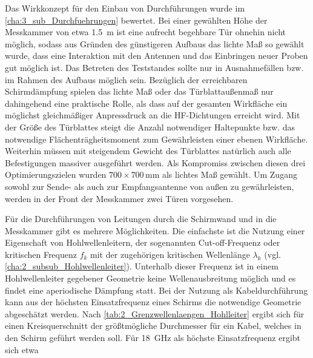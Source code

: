 \par
\vspace{\linespace} 
Das Wirkkonzept für den Einbau von Durchführungen wurde im \Abschnitt\ref{cha:3_sub_Durchfuehrungen} bewertet. Bei einer gewählten Höhe der Messkammer von etwa \SI{1,5}{\meter} ist eine aufrecht begehbare Tür ohnehin nicht möglich, sodass aus Gründen des günstigeren Aufbaus das lichte Maß so gewählt wurde, dass eine Interaktion mit den Antennen und das Einbringen neuer Proben gut möglich ist. Das Betreten des Teststandes sollte nur in Ausnahmefällen bzw. im Rahmen des Aufbaus möglich sein. Bezüglich der erreichbaren Schirmdämpfung spielen das lichte Maß oder das Türblattaußenmaß nur dahingehend eine praktische Rolle, als dass auf der gesamten Wirkfläche ein möglichst gleichmäßiger Anpressdruck an die HF-Dichtungen erreicht wird. Mit der Größe des Türblattes steigt die Anzahl notwendiger Haltepunkte bzw. das notwendige Flächenträgheitsmoment zum Gewährleisten einer ebenen Wirkfläche. Weiterhin müssen mit steigendem Gewicht des Türblattes natürlich auch alle Befestigungen massiver ausgeführt werden. Als Kompromiss zwischen diesen drei Optimierungszielen wurden $700 \times 700\,\si{\milli\meter}$ als lichtes Maß gewählt. Um Zugang sowohl zur Sende- als auch zur Empfangsantenne von außen zu gewährleisten, werden in der Front der Messkammer zwei Türen vorgesehen.
\par
\vspace{\linespace}
Für die Durchführungen von Leitungen durch die Schirmwand und in die Messkammer gibt es mehrere Möglichkeiten. Die einfachste ist die Nutzung einer Eigenschaft von Hohlwellenleitern, der sogenannten Cut-off-Frequenz oder kritischen Frequenz $f_k$ mit der zugehörigen kritischen Wellenlänge $\lambda_k$ (vgl. \Abschnitt\ref{cha:2_subsub_Hohlwellenleiter}). Unterhalb dieser Frequenz ist in einem Hohlwellenleiter gegebener Geometrie keine Wellenausbreitung möglich und es findet eine aperiodische Dämpfung statt. Bei der Nutzung als Kabeldurchführung kann aus der höchsten Einsatzfrequenz eines Schirms die notwendige Geometrie abgeschätzt werden. Nach \Tabelle\ref{tab:2_Grenzwellenlaengen_Hohlleiter} ergibt sich für einen Kreisquerschnitt der größtmögliche Durchmesser für ein Kabel, welches in den Schirm geführt werden soll. Für \SI{18}{\giga\hertz} als höchste Einsatzfrequenz ergibt sich etwa

